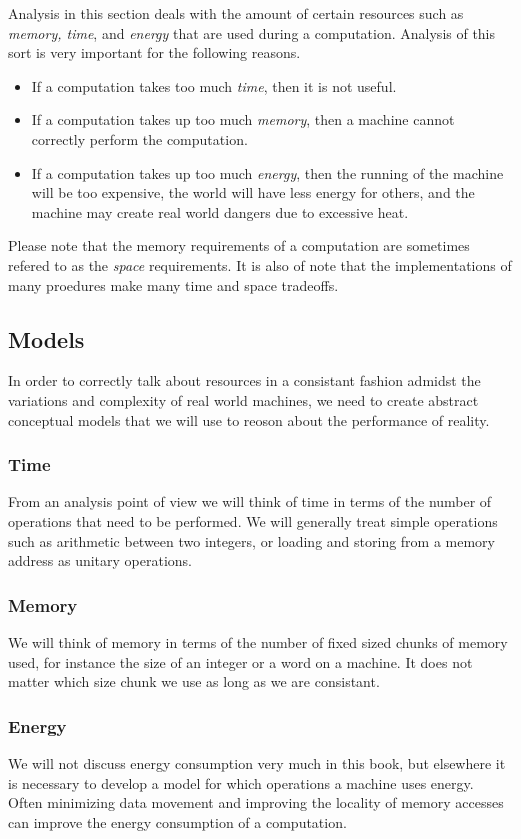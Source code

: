\documentclass[12pt, letterpaper]{book}
\begin{document}
	Analysis in this section deals with the amount of certain resources such as \textit{memory, time}, and \textit{energy} that are used during a computation. Analysis of this sort is very important for the following reasons.
\begin{itemize}
  \item  If a computation takes too much \textit{time}, then it is not useful.
  \item  If a computation takes up too much \textit{memory}, then a machine cannot correctly perform the computation.
  \item  If a computation takes up too much \textit{energy}, then the running of the machine will be too expensive, the world will have less energy for others, and the machine may create real world dangers due to excessive heat.
\end{itemize}
	Please note that the memory requirements of a computation are sometimes refered to as the \textit{space} requirements. It is also of note that the implementations of many proedures make many time and space tradeoffs.

		\subsection{Models}

In order to correctly talk about resources in a consistant fashion admidst the variations and complexity of real world machines, we need to create abstract conceptual models that we will use to reoson about the performance of reality. 
\subsubsection{Time}
	From an analysis point of view we will think of time in terms of the number of operations that need to be performed. We will generally treat simple operations such as arithmetic between two integers, or loading and storing from a memory address as unitary operations.
\subsubsection{Memory}
	We will think of memory in terms of the number of fixed sized chunks of memory used, for instance the size of an integer or a word on a machine. It does not matter which size chunk we use as long as we are consistant.
\subsubsection{Energy}
	We will not discuss energy consumption very much in this book, but elsewhere it is necessary to develop a model for which operations a machine uses energy. Often minimizing data movement and improving the locality of memory accesses can improve the energy consumption of a computation.
\end{document}
